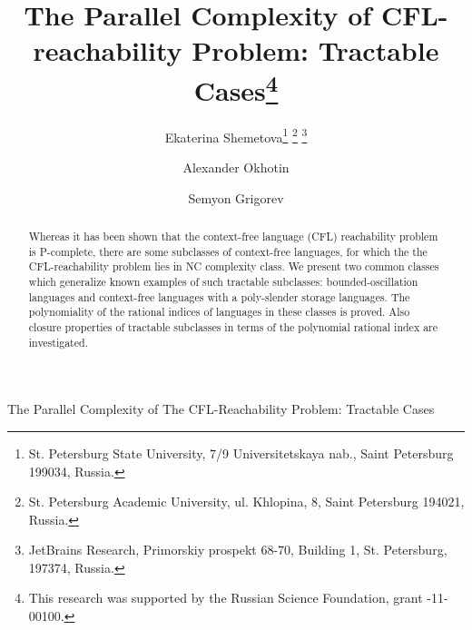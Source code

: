 \documentclass{ws-ijfcs}
\begin{document}
{The Parallel Complexity of The CFL-Reachability Problem:
Tractable Cases
}

%
\catchline{}{}{}{}{}
%

\title{The Parallel Complexity of CFL-reachability Problem:
Tractable Cases\footnote{
This research was supported by the Russian Science Foundation, grant -11-00100.}}

\author{Ekaterina Shemetova\footnote{
St. Petersburg State University, 
7/9 Universitetskaya nab., Saint Petersburg 199034, Russia.}
\footnote{
St. Petersburg Academic University, 
ul. Khlopina, 8, Saint Petersburg 194021, Russia.}
\footnote{
JetBrains Research,
Primorskiy prospekt 68-70, Building 1, St. Petersburg, 197374, Russia.}
}

\address{
}

\author{Alexander Okhotin\footnotemark[2] }

\address{
}

\author{Semyon Grigorev\footnotemark[2] \footnotemark[4] }

\address{
}


\maketitle

\begin{history}
\end{history}

\begin{abstract}
Whereas it has been shown that  the context-free language (CFL) reachability problem is P-complete, there are some subclasses of context-free languages, for which the the CFL-reachability problem lies in NC complexity class. We present two common classes which generalize known examples of such tractable subclasses: bounded-oscillation languages and context-free languages with a poly-slender storage languages. The polynomiality of the rational indices of languages in these classes is proved. Also closure properties of tractable subclasses in terms of the polynomial rational index are investigated.
\end{abstract}
\end{document}
